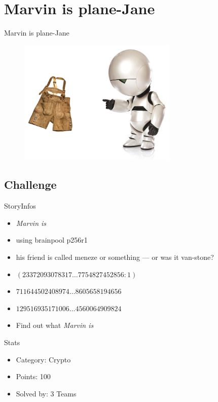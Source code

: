 \section{Marvin is plane-Jane}
\begin{frame}{Marvin is plane-Jane}
    \begin{figure}[!htb]
        \includegraphics[height=60mm]{data/marvin.jpg}
    \end{figure}
\end{frame}

\subsection{Challenge}
\begin{frame}{Story}{Infos}
    \begin{itemize}
        \item \emph{Marvin is}
        \item using brainpool p256r1
        \item his friend is called meneze or something --- or was it van-stone?\\[5mm]
        \item $(23372093078317\ldots7754827452856 : 1)$
        \item $711644502408974\ldots8605658194656$
        \item $129516935171006\ldots4560064909824$\\[5mm]
        \item Find out what \emph{Marvin is}
    \end{itemize}
\end{frame}

\begin{frame}{Stats}
    \begin{itemize}
        \item Category: Crypto
        \item Points: 100
        \item Solved by: 3 Teams
    \end{itemize}
\end{frame}

